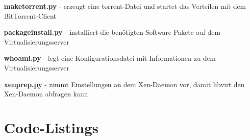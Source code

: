 \textbf{maketorrent.py}
- erzeugt eine torrent-Datei und startet das Verteilen mit dem BitTorrent-Client

\textbf{packageinstall.py}
- installiert die benötigten Software-Pakete auf dem Virtualisierungsserver

\textbf{whoami.py}
- legt eine Konfigurationsdatei mit Informationen zu dem Virtualisierungsserver

\textbf{xenprep.py}
- nimmt Einstellungen an dem Xen-Daemon vor, damit libvirt den Xen-Daemon abfragen kann 

\section{Code-Listings}












